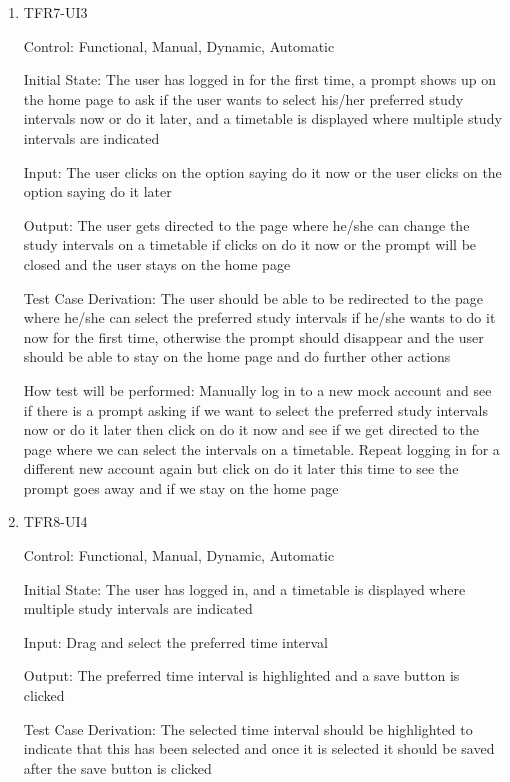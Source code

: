\documentclass[12pt, titlepage]{article}
\begin{document}
\begin{enumerate}[resume]
  \item{TFR7-UI3\\} \label{TFR7-UI3}
  
  Control: Functional, Manual, Dynamic, Automatic
            
  Initial State: The user has logged in for the first time, a prompt shows up on the home page to ask if the user wants to select his/her preferred study intervals now or do it later, and a timetable is displayed where multiple study intervals are indicated
            
  Input: The user clicks on the option saying do it now or the user clicks on the option saying do it later
            
  Output: The user gets directed to the page where he/she can change the study intervals on a timetable if clicks on do it now or the prompt will be closed and the user stays on the home page
  
  Test Case Derivation: The user should be able to be redirected to the page where he/she can select the preferred study intervals if he/she wants to do it now for the first time, otherwise the prompt should disappear and the user should be able to stay on the home page and do further other actions
  
  How test will be performed: Manually log in to a new mock account and see if there is a prompt asking if we want to select the preferred study intervals now or do it later then click on do it now and see if we get directed to the page where we can select the intervals on a timetable. Repeat logging in for a different new account again but click on do it later this time to see the prompt goes away and if we stay on the home page
  
  \item{TFR8-UI4\\} \label{TFR8-UI4}
  
  Control: Functional, Manual, Dynamic, Automatic
            
  Initial State: The user has logged in, and a timetable is displayed where multiple study intervals are indicated
            
  Input: Drag and select the preferred time interval
            
  Output: The preferred time interval is highlighted and a save button is clicked
  
  Test Case Derivation: The selected time interval should be highlighted to indicate that this has been selected and once it is selected it should be saved after the save button is clicked
  

\end{enumerate}
\end{document}
